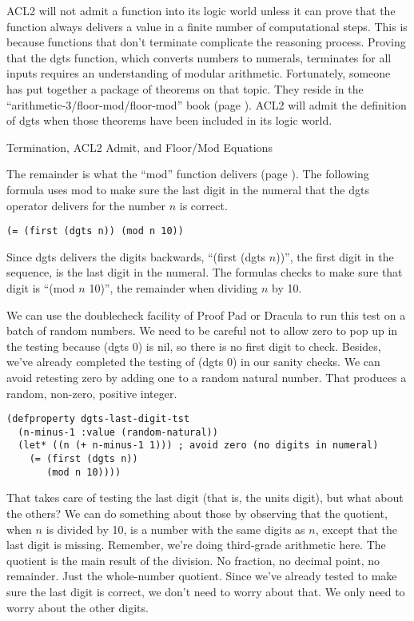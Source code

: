 \begin{aside}
ACL2 will not admit a function into its logic world unless
it can prove that the function always delivers a value in
a finite number of computational steps.
This is because functions that don't terminate complicate the reasoning process.
Proving that the dgts function, which converts numbers to numerals,
terminates for all inputs requires an understanding of modular arithmetic.
Fortunately, someone has put together a package of theorems on that topic.
They reside in the ``arithmetic-3/floor-mod/floor-mod'' book
(page \pageref{floor-mod-include-book}).
ACL2 will admit the definition of dgts when those theorems
have been included in its logic world.
\caption{Termination, ACL2 Admit, and Floor/Mod Equations}
\label{admit-def}
\label{floor-mod-book}
\end{aside}

The remainder is
what the ``mod'' function delivers (page \pageref{mod-function}).
The following formula uses mod to make sure the last digit in the numeral
that the dgts operator delivers for the number $n$ is correct.
\begin{Verbatim}
(= (first (dgts n)) (mod n 10))
\end{Verbatim}

Since dgts delivers the digits backwards,
``(first (dgts $n$))'', the first digit in the sequence,
is the last digit in the numeral.
The formulas checks to make sure that digit is ``(mod $n$ 10)'',
the remainder when dividing $n$ by 10.

We can use the doublecheck facility of Proof Pad or Dracula to run this test on a batch of random numbers.
We need to be careful not to allow zero to pop up in the testing
because (dgts 0) is nil, so there is no first digit to check.
Besides, we've already completed the testing of (dgts 0) in our sanity checks.
We can avoid retesting zero by adding one to a random natural number.
That produces a random, non-zero, positive integer.
\begin{Verbatim}
(defproperty dgts-last-digit-tst
  (n-minus-1 :value (random-natural))
  (let* ((n (+ n-minus-1 1))) ; avoid zero (no digits in numeral)
    (= (first (dgts n))
       (mod n 10))))
\end{Verbatim}

That takes care of testing the last digit
(that is, the units digit), but what about the others?
We can do something about those by observing that the quotient,
when $n$ is divided by 10,
is a number with the same digits as $n$,
except that the last digit is missing.
Remember, we're doing third-grade arithmetic here.
The quotient is the main result of the division.
No fraction, no decimal point, no remainder. Just the whole-number quotient.
Since we've already tested to make sure the last digit is correct,
we don't need to worry about that.
We only need to worry about the other digits.

